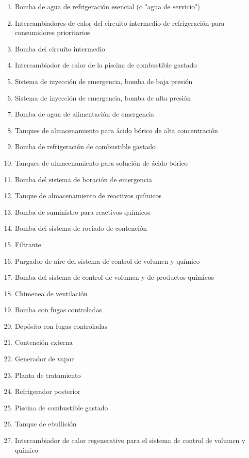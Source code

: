 \documentclass[]{article}
\begin{document}
\begin{multicols}{2}
	\begin{enumerate}
		\item Bomba de agua de refrigeración esencial (o "agua de servicio")
		\item Intercambiadores de calor del circuito intermedio de refrigeración para consumidores prioritarios
		\item Bomba del circuito intermedio
		\item Intercambiador de calor de la piscina de combustible gastado
		\item Sistema de inyección de emergencia, bomba de baja presión
		\item Sistema de inyección de emergencia, bomba de alta presión
		\item Bomba de agua de alimentación de emergencia
		\item Tanques de almacenamiento para ácido bórico de alta concentración
		\item Bomba de refrigeración de combustible gastado
		\item Tanques de almacenamiento para solución de ácido bórico
		\item Bomba del sistema de boración de emergencia
		\item Tanque de almacenamiento de reactivos químicos
		\item Bomba de suministro para reactivos químicos
		\item Bomba del sistema de rociado de contención
		\item Filtrante
		\item Purgador de aire del sistema de control de volumen y químico
		\item Bomba del sistema de control de volumen y de productos químicos
		\item Chimenea de ventilación
		\item Bomba con fugas controladas
		\item Depósito con fugas controladas
		\item Contención externa
		\item Generador de vapor
		\item Planta de tratamiento
		\item Refrigerador posterior
		\item Piscina de combustible gastado
		\item Tanque de ebullición
		\item Intercambiador de calor regenerativo para el sistema de control de volumen y químico

\end{enumerate}
\end{multicols}
\end{document}

